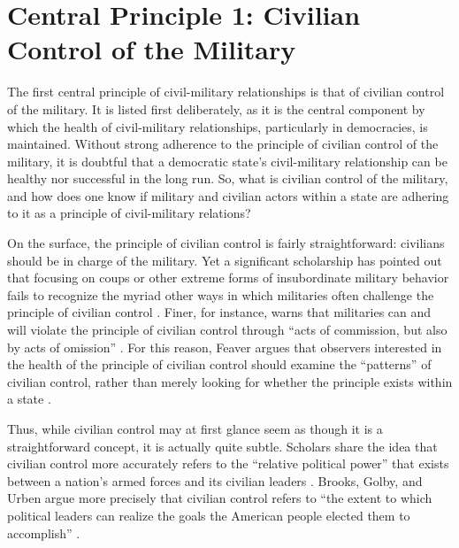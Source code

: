 \documentclass[
  12pt,
  oneside]{memoir}
\begin{document}
\hypertarget{central-principle-1-civilian-control-of-the-military}{%
\section{Central Principle 1: Civilian Control of the Military}\label{central-principle-1-civilian-control-of-the-military}}

The first central principle of civil-military relationships is that of civilian control of the military. It is listed first deliberately, as it is the central component by which the health of civil-military relationships, particularly in democracies, is maintained. Without strong adherence to the principle of civilian control of the military, it is doubtful that a democratic state's civil-military relationship can be healthy nor successful in the long run. So, what is civilian control of the military, and how does one know if military and civilian actors within a state are adhering to it as a principle of civil-military relations?

On the surface, the principle of civilian control is fairly straightforward: civilians should be in charge of the military. Yet a significant scholarship has pointed out that focusing on coups or other extreme forms of insubordinate military behavior fails to recognize the myriad other ways in which militaries often challenge the principle of civilian control \autocites{croissant_beyond_2010}[see also][242]{cohen_supreme_2003}{beliakova_erosion_2021}. Finer, for instance, warns that militaries can and will violate the principle of civilian control through ``acts of commission, but also by acts of omission'' \autocite[20]{finer_man_1962}. For this reason, Feaver argues that observers interested in the health of the principle of civilian control should examine the ``patterns'' of civilian control, rather than merely looking for whether the principle exists within a state \autocite[167]{feaver_civil-military_1996}.

Thus, while civilian control may at first glance seem as though it is a straightforward concept, it is actually quite subtle. Scholars share the idea that civilian control more accurately refers to the ``relative political power'' that exists between a nation's armed forces and its civilian leaders \autocites[7]{bruneau_civil-military_2019}[see also][]{brooks_shaping_2008}. Brooks, Golby, and Urben argue more precisely that civilian control refers to ``the extent to which political leaders can realize the goals the American people elected them to accomplish'' \autocite[65]{brooks_crisis_2021}.
\end{document}
